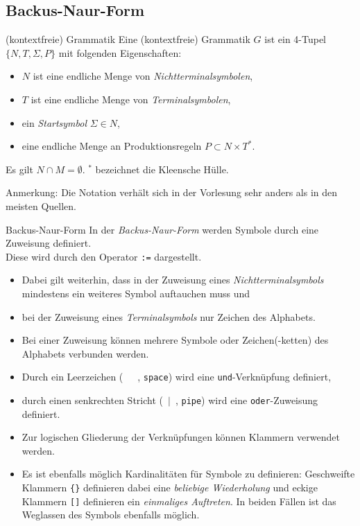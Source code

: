\documentclass[german]{spicker}
\begin{document}
\subsection{Backus-Naur-Form}

\begin{defi}{(kontextfreie) Grammatik}
    Eine (kontextfreie) Grammatik $G$ ist ein 4-Tupel $\{N, T, \Sigma, P\}$ mit folgenden Eigenschaften:
    \begin{itemize}
        \item $N$ ist eine endliche Menge von \emph{Nichtterminalsymbolen},
        \item $T$ ist eine endliche Menge von \emph{Terminalsymbolen},
        \item ein \emph{Startsymbol} $\Sigma \in N$,
        \item eine endliche Menge an Produktionsregeln $P \subset N \times T^*$.
    \end{itemize}
    Es gilt $N \cap M = \emptyset$. $^*$ bezeichnet die Kleensche Hülle.

    Anmerkung: Die Notation verhält sich in der Vorlesung sehr anders als in den meisten Quellen.
\end{defi}

\begin{defi}{Backus-Naur-Form}
    In der \emph{Backus-Naur-Form} werden Symbole durch eine Zuweisung definiert.\\
    Diese wird durch den Operator \texttt{:=} dargestellt.

    \begin{itemize}
        \item Dabei gilt weiterhin, dass in der Zuweisung eines \emph{Nichtterminalsymbols} mindestens ein weiteres Symbol auftauchen muss und
        \item bei der Zuweisung eines \emph{Terminalsymbols} nur Zeichen des Alphabets.
        \item Bei einer Zuweisung können mehrere Symbole oder Zeichen(-ketten) des Alphabets verbunden werden.
        \item Durch ein Leerzeichen (\glqq ~~~\grqq, \texttt{space}) wird eine \texttt{und}-Verknüpfung definiert,
        \item durch einen senkrechten Stricht (\glqq ~$\mid$~\grqq, \texttt{pipe}) wird eine \texttt{oder}-Zuweisung definiert.
        \item Zur logischen Gliederung der Verknüpfungen können Klammern verwendet werden.
        \item Es ist ebenfalls möglich Kardinalitäten für Symbole zu definieren:
              \subitem Geschweifte Klammern \texttt{\{\}} definieren dabei eine \emph{beliebige Wiederholung} und
              \subitem eckige Klammern \texttt{[]} definieren ein \emph{einmaliges Auftreten}.
              \subitem In beiden Fällen ist das Weglassen des Symbols ebenfalls möglich.
    \end{itemize}
\end{defi}
\end{document}
